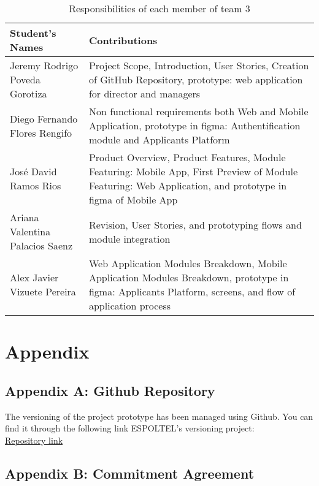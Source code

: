 \documentclass{scrreprt}
\begin{document}
\begin{table}[h!]
    \centering \small
    \renewcommand{\arraystretch}{1.5} %
    \begin{tabular}{|p{5cm}|p{10cm}|} %
    \hline
    \textbf{Student's Names} & \textbf{Contributions} \\ \hline
    Jeremy Rodrigo Poveda Gorotiza & Project Scope, Introduction, User Stories, Creation of GitHub Repository, prototype: web application for director and managers \\ \hline
    Diego Fernando Flores Rengifo & Non functional requirements both Web and Mobile Application, prototype in figma: Authentification module and Applicants Platform  \\ \hline
    José David Ramos Rios & Product Overview, Product Features, Module Featuring: Mobile App, First Preview of Module Featuring: Web Application, and prototype in figma of Mobile App \\ \hline
    Ariana Valentina Palacios Saenz & Revision, User Stories, and prototyping flows and module integration\\ \hline
    Alex Javier Vizuete Pereira & Web Application Modules Breakdown, Mobile Application Modules Breakdown, prototype in figma: Applicants Platform, screens, and flow of application process\\ \hline
    \end{tabular}
    \caption{Responsibilities of each member of team 3}
\end{table} \FloatBarrier 



\chapter{Appendix}

\section{Appendix A: Github Repository}
The versioning of the project prototype has been managed using Github. You can find it through the following link ESPOLTEL's versioning project:\\ \href{https://github.com/Jeremy-Poveda/EspoltelHiringManager}{Repository link}
\section{Appendix B: Commitment Agreement}
 
\end{document}
